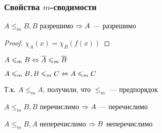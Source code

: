 \subsubsection{Свойства \(m\)-сводимости}
\begin{proposition}
    \(A \le_m B, B\) разрешимо \(\Rightarrow A\) --- разрешимо
\end{proposition}
\begin{proof}
    \(\chi_A(x) = \chi_B(f(x))\)
\end{proof}
\begin{proposition}
    \(A \leqslant_m B \Leftrightarrow \overline{A} \leqslant_m \overline{B}\)
\end{proposition}
\begin{proposition}
    \(A \leqslant_m B, B \leqslant_m C \Leftrightarrow A \leqslant_m C\)
\end{proposition}

\begin{note}
    Т.к. \(A \le_m A\), получили, что \(\le_m\) --- предпорядок
\end{note}

\begin{proposition}
    \(A \le_m B, B\) перечислимо \(\Rightarrow A\) --- перечислимо
\end{proposition}

\begin{corollary}
    \(A \le_m B, A\) неперечислимо \(\Rightarrow B\) неперечислимо
\end{corollary}

